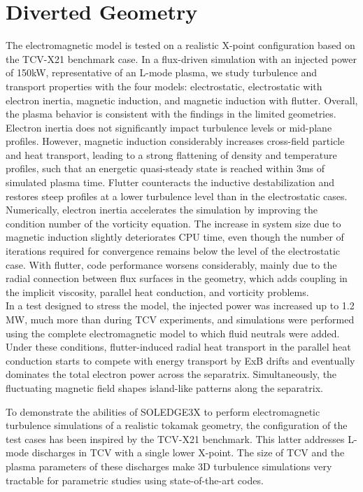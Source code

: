 \chapter{Diverted Geometry}
\label{chap:TCV}

\begin{chaptersummarybox}
	The electromagnetic model is tested on a realistic X-point configuration based on the TCV-X21 benchmark case. In a flux-driven simulation with an injected power of 150kW, representative of an L-mode plasma, we study turbulence and transport properties with the four models: electrostatic, electrostatic with electron inertia, magnetic induction, and magnetic induction with flutter. Overall, the plasma behavior is consistent with the findings in the limited geometries. Electron inertia does not significantly impact turbulence levels or mid-plane profiles. However, magnetic induction considerably increases cross-field particle and heat transport, leading to a strong flattening of density and temperature profiles, such that an energetic quasi-steady state is reached within 3ms of simulated plasma time. Flutter counteracts the inductive destabilization and restores steep profiles at a lower turbulence level than in the electrostatic cases. \\
	Numerically, electron inertia accelerates the simulation by improving the condition number of the vorticity equation. The increase in system size due to magnetic induction slightly deteriorates CPU time, even though the number of iterations required for convergence remains below the level of the electrostatic case. With flutter, code performance worsens considerably, mainly due to the radial connection between flux surfaces in the geometry, which adds coupling in the implicit viscosity, parallel heat conduction, and vorticity problems. \\
	In a test designed to stress the model, the injected power was increased up to 1.2 MW, much more than during TCV experiments, and simulations were performed using the complete electromagnetic model to which fluid neutrals were added. Under these conditions, flutter-induced radial heat transport in the parallel heat conduction starts to compete with energy transport by ExB drifts and eventually dominates the total electron power across the separatrix. Simultaneously, the fluctuating magnetic field shapes island-like patterns along the separatrix.
\end{chaptersummarybox}

\newpage


To demonstrate the abilities of SOLEDGE3X to perform electromagnetic turbulence simulations of a realistic tokamak geometry, the configuration of the test cases has been inspired by the TCV-X21 benchmark\cite{oliveira2022}. This latter addresses L-mode discharges in TCV with a single lower X-point. The size of TCV and the plasma parameters of these discharges make 3D turbulence simulations very tractable for parametric studies using state-of-the-art codes.


